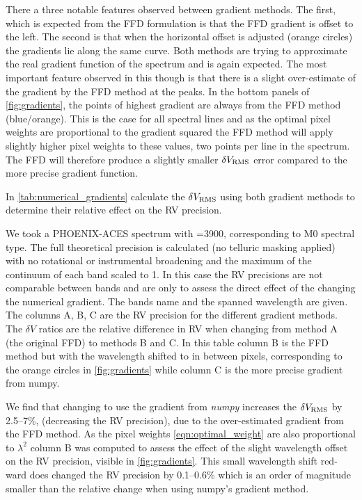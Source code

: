 {There a three notable features observed between gradient methods.
The first, which is expected from the {FFD} formulation is that the {FFD} gradient is offset to the left.
The second is that when the horizontal offset is adjusted (orange circles) the gradients lie along the same curve.
Both methods are trying to approximate the real gradient function of the spectrum and is again expected.
The most important feature observed in this though is that there is a slight over-estimate of the gradient by the {FFD} method at the peaks.
In the bottom panels of \cref{fig:gradients}, the points of highest gradient are always from the {FFD} method (blue/orange).
This is the case for all spectral lines and as the optimal pixel weights are proportional to the gradient squared the {FFD} method will apply slightly higher pixel weights to these values, two points per line in the spectrum.
The {FFD} will therefore produce a slightly smaller \(\delta V_{\textrm{RMS}}\) error compared to the more precise gradient function.

In \cref{tab:numerical_gradients}  calculate the  \(\delta V_{\textrm{RMS}}\) using both gradient methods to determine their relative effect on the {RV} precision.

We took a {PHOENIX-ACES} spectrum with \Teff{}=3900\K{}, corresponding to {{M0}} spectral type.
The full theoretical precision is calculated (no telluric masking applied) with no rotational or instrumental broadening and the maximum of the continuum of each band scaled to 1.
In this case the {RV} precisions are not comparable between bands and are only to assess the direct effect of the changing the numerical gradient.
The bands name and the spanned wavelength are given.
The columns A, B, C are the {RV} precision for the different gradient methods.
The \(\delta V\) ratios are the relative difference in {RV} when changing from method A (the original {FFD}) to methods B and C.
In this table column B is the {FFD} method but with the wavelength shifted to in between pixels, corresponding to the orange circles in \cref{fig:gradients} while column C is the more precise gradient from numpy.

We find that changing to use the gradient from \emph{numpy} increases the \(\delta V_{\textrm{RMS}}\) by 2.5--7\%, (decreasing the {RV} precision), due to the over-estimated gradient from the {FFD} method.
As the pixel weights \cref{eqn:optimal_weight} are also proportional to \({\lambda}^{2}\) column B was computed to assess the effect of the slight wavelength offset on the {RV} precision, visible in \cref{fig:gradients}.
This small wavelength shift red-ward does changed the {RV} precision by 0.1--0.6\% which is an order of magnitude smaller than the relative change when using numpy's gradient method.

}
